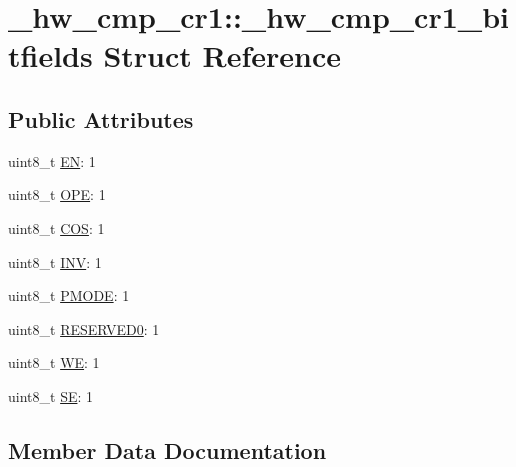 \hypertarget{struct__hw__cmp__cr1_1_1__hw__cmp__cr1__bitfields}{}\section{\+\_\+hw\+\_\+cmp\+\_\+cr1\+:\+:\+\_\+hw\+\_\+cmp\+\_\+cr1\+\_\+bitfields Struct Reference}
\label{struct__hw__cmp__cr1_1_1__hw__cmp__cr1__bitfields}
\subsection*{Public Attributes}
\begin{DoxyCompactItemize}
\item 
uint8\+\_\+t \hyperlink{struct__hw__cmp__cr1_1_1__hw__cmp__cr1__bitfields_ad655c547f43f0304b99c8d8a3a268211}{EN}\+: 1
\item 
uint8\+\_\+t \hyperlink{struct__hw__cmp__cr1_1_1__hw__cmp__cr1__bitfields_a0f4ad6266e5d8283d55659fca982c77b}{O\+PE}\+: 1
\item 
uint8\+\_\+t \hyperlink{struct__hw__cmp__cr1_1_1__hw__cmp__cr1__bitfields_a3eafe237da2a0e04cc3428daf74a6baa}{C\+OS}\+: 1
\item 
uint8\+\_\+t \hyperlink{struct__hw__cmp__cr1_1_1__hw__cmp__cr1__bitfields_ad170662d03a99d8d562a3f4950d486cc}{I\+NV}\+: 1
\item 
uint8\+\_\+t \hyperlink{struct__hw__cmp__cr1_1_1__hw__cmp__cr1__bitfields_a6d813de65dc15c7ec9fa8c0ae50c41bb}{P\+M\+O\+DE}\+: 1
\item 
uint8\+\_\+t \hyperlink{struct__hw__cmp__cr1_1_1__hw__cmp__cr1__bitfields_aa21b965618b4318d317f98e840c1731d}{R\+E\+S\+E\+R\+V\+E\+D0}\+: 1
\item 
uint8\+\_\+t \hyperlink{struct__hw__cmp__cr1_1_1__hw__cmp__cr1__bitfields_a0dd2ce9756e99aa9229190fe29aada77}{WE}\+: 1
\item 
uint8\+\_\+t \hyperlink{struct__hw__cmp__cr1_1_1__hw__cmp__cr1__bitfields_a85f2cbe81bad2ee8248f8a36a9452cac}{SE}\+: 1
\end{DoxyCompactItemize}


\subsection{Member Data Documentation}
